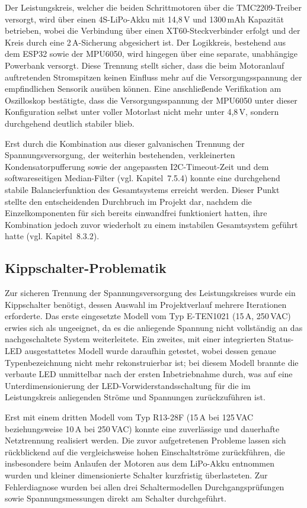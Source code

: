 \documentclass[12pt,ngerman,numbers=noenddot,abstracton,headsepline]{scrreprt}
\begin{document}
Der Leistungskreis, welcher die beiden Schrittmotoren über die TMC2209-Treiber versorgt, wird über einen 4S-LiPo-Akku mit 14,8\,V und 1300\,mAh Kapazität betrieben, wobei die Verbindung über einen XT60-Steckverbinder erfolgt und der Kreis durch eine 2\,A-Sicherung abgesichert ist. Der Logikkreis, bestehend aus dem ESP32 sowie der MPU6050, wird hingegen über eine separate, unabhängige Powerbank versorgt. Diese Trennung stellt sicher, dass die beim Motoranlauf auftretenden Stromspitzen keinen Einfluss mehr auf die Versorgungsspannung der empfindlichen Sensorik ausüben können. Eine anschließende Verifikation am Oszilloskop bestätigte, dass die Versorgungsspannung der MPU6050 unter dieser Konfiguration selbst unter voller Motorlast nicht mehr unter 4,8\,V, sondern durchgehend deutlich stabiler blieb.

Erst durch die Kombination aus dieser galvanischen Trennung der Spannungsversorgung, der weiterhin bestehenden, verkleinerten Kondensatorpufferung sowie der angepassten I2C-Timeout-Zeit und dem softwareseitigen Median-Filter (vgl. Kapitel~7.5.4) konnte eine durchgehend stabile Balancierfunktion des Gesamtsystems erreicht werden. Dieser Punkt stellte den entscheidenden Durchbruch im Projekt dar, nachdem die Einzelkomponenten für sich bereits einwandfrei funktioniert hatten, ihre Kombination jedoch zuvor wiederholt zu einem instabilen Gesamtsystem geführt hatte (vgl. Kapitel~8.3.2).

\subsection{Kippschalter-Problematik}
\label{subsec:kippschalter}

Zur sicheren Trennung der Spannungsversorgung des Leistungskreises wurde ein Kippschalter benötigt, dessen Auswahl im Projektverlauf mehrere Iterationen erforderte. Das erste eingesetzte Modell vom Typ E-TEN1021 (15\,A, 250\,VAC) erwies sich als ungeeignet, da es die anliegende Spannung nicht vollständig an das nachgeschaltete System weiterleitete. Ein zweites, mit einer integrierten Status-LED ausgestattetes Modell wurde daraufhin getestet, wobei dessen genaue Typenbezeichnung nicht mehr rekonstruierbar ist; bei diesem Modell brannte die verbaute LED unmittelbar nach der ersten Inbetriebnahme durch, was auf eine Unterdimensionierung der LED-Vorwiderstandsschaltung für die im Leistungskreis anliegenden Ströme und Spannungen zurückzuführen ist.

Erst mit einem dritten Modell vom Typ R13-28F (15\,A bei 125\,VAC beziehungsweise 10\,A bei 250\,VAC) konnte eine zuverlässige und dauerhafte Netztrennung realisiert werden. Die zuvor aufgetretenen Probleme lassen sich rückblickend auf die vergleichsweise hohen Einschaltströme zurückführen, die insbesondere beim Anlaufen der Motoren aus dem LiPo-Akku entnommen wurden und kleiner dimensionierte Schalter kurzfristig überlasteten. Zur Fehlerdiagnose wurden bei allen drei Schaltermodellen Durchgangsprüfungen sowie Spannungsmessungen direkt am Schalter durchgeführt.
\end{document}
